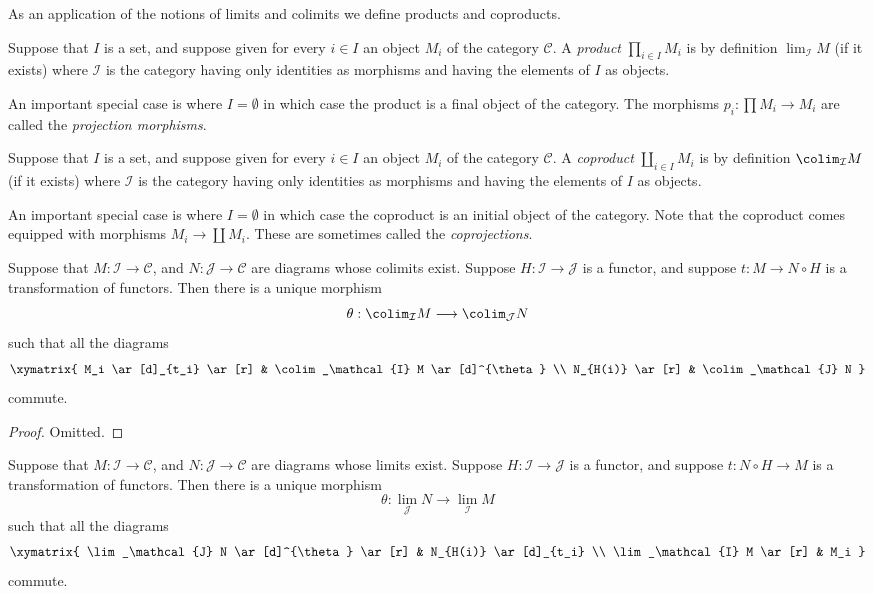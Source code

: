\noindent
As an application of the notions of limits and colimits
we define products and coproducts.

\begin{definition}
\label{definition-product}
Suppose that $I$ is a set, and suppose given for every $i \in I$ an
object $M_i$ of the category $\mathcal{C}$. A {\it product}
$\prod_{i\in I} M_i$ is by definition $\lim_\mathcal{I} M$
(if it exists)
where $\mathcal{I}$ is the category having only identities as
morphisms and having the elements of $I$ as objects.
\end{definition}

\noindent
An important special case is where $I = \emptyset$ in which case the
product is a final object of the category.
The morphisms $p_i : \prod M_i \to M_i$ are called the
{\it projection morphisms}.

\begin{definition}
\label{definition-coproduct}
Suppose that $I$ is a set, and suppose given for every $i \in I$ an
object $M_i$ of the category $\mathcal{C}$. A {\it coproduct}
$\coprod_{i\in I} M_i$ is by definition $\colim_\mathcal{I} M$
(if it exists) where $\mathcal{I}$ is the category having only
identities as morphisms and having the elements of $I$ as objects.
\end{definition}

\noindent
An important special case is where $I = \emptyset$ in which case the
coproduct is an initial object of the category.
Note that the coproduct comes equipped with morphisms
$M_i \to \coprod M_i$. These are sometimes called the
{\it coprojections}.

\begin{lemma}
\label{lemma-functorial-colimit}
Suppose that $M : \mathcal{I} \to \mathcal{C}$,
and $N : \mathcal{J} \to \mathcal{C}$ are diagrams
whose colimits exist. Suppose
$H : \mathcal{I} \to \mathcal{J}$ is
a functor, and suppose $t : M \to N \circ H$
is a transformation of functors.
Then there is a unique morphism
$$
\theta :
\colim_\mathcal{I} M
\longrightarrow
\colim_\mathcal{J} N
$$
such that all the diagrams
$$
\xymatrix{
M_i \ar[d]_{t_i} \ar[r]
&
\colim_\mathcal{I} M \ar[d]^{\theta}
\\
N_{H(i)} \ar[r]
&
\colim_\mathcal{J} N
}
$$
commute.
\end{lemma}

\begin{proof}
Omitted.
\end{proof}

\begin{lemma}
\label{lemma-functorial-limit}
Suppose that $M : \mathcal{I} \to \mathcal{C}$,
and $N : \mathcal{J} \to \mathcal{C}$ are diagrams
whose limits exist. Suppose $H : \mathcal{I} \to \mathcal{J}$ is
a functor, and suppose $t : N \circ H \to M$
is a transformation of functors.
Then there is a unique morphism
$$
\theta :
\lim_\mathcal{J} N
\longrightarrow
\lim_\mathcal{I} M
$$
such that all the diagrams
$$
\xymatrix{
\lim_\mathcal{J} N \ar[d]^{\theta} \ar[r]
&
N_{H(i)} \ar[d]_{t_i}
\\
\lim_\mathcal{I} M \ar[r]
&
M_i
}
$$
commute.
\end{lemma}

